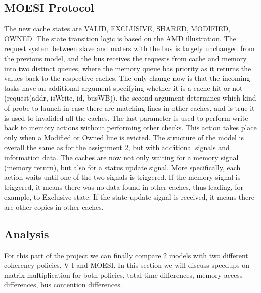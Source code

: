 \subsection{MOESI Protocol}
The new cache states are VALID, EXCLUSIVE, SHARED, MODIFIED, OWNED. The state transition logic is based on the AMD illustration. The request system between slave and maters with the bus is largely unchanged from the previous model, and the bus receives the requests from cache and memory into two distinct queues, where the memory queue has priority as it returns the values back to the respective caches. The only change now is that the incoming tasks have an additional argument specifying whether it is a cache hit or not (request(addr, isWrite, id, busWB)). the second argument determines which kind of probe to launch in case there are matching lines in other caches, and is true it is used to invalided all the caches. The last parameter is used to perform write-back to memory actions without performing other checks. This action takes place only when a Modified or Owned line is evicted. The structure of the model is overall the same as for the assignment 2, but with additional signals and information data. The caches are now not only waiting for a memory signal (memory return), but also for a status update signal. More specifically, each action waits until one of the two signals is triggered. If the memory signal is triggered, it means there was no data found in other caches, thus leading, for example, to Exclusive state. If the state update signal is received, it means there are other copies in other caches.  
    

\subsection{Analysis}

For this part of the project we can finally compare 2 models with two different coherency policies, V-I and MOESI. In this section we will discuss speedups on matrix multiplication for both policies, total time differences, memory access differences, bus contention differences.

